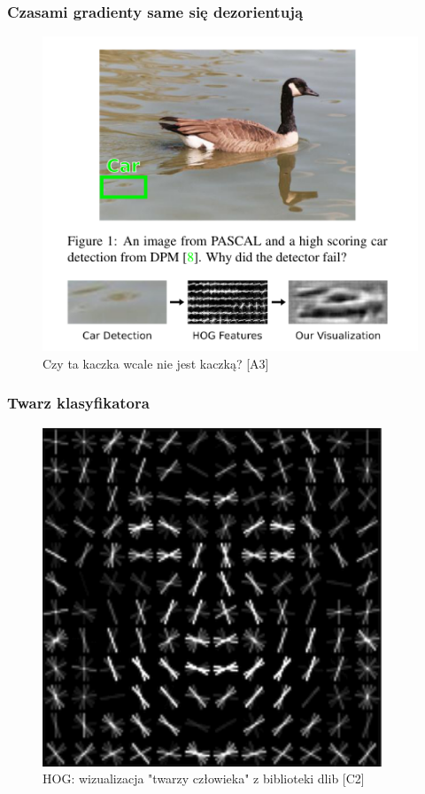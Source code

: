 \documentclass{beamer}
\begin{document}
            \begin{frame}
                \frametitle{Czasami gradienty same się dezorientują}
                \begin{center}
                    \begin{figure}
                        \includegraphics[height=0.75\textheight]{pictures/vondrick_duck.png}
                        \caption{Czy ta kaczka wcale nie jest kaczką? [A3]}
                    \end{figure}
                \end{center}
            \end{frame}

            \begin{frame}
                \frametitle{Twarz klasyfikatora}
                \begin{center}
                    \begin{figure}
                        \includegraphics[height=0.75\textheight]{pictures/hog.png}
                        \caption{HOG: wizualizacja "twarzy człowieka" z biblioteki dlib [C2]}
                    \end{figure}
                \end{center}
            \end{frame}
\end{document}
